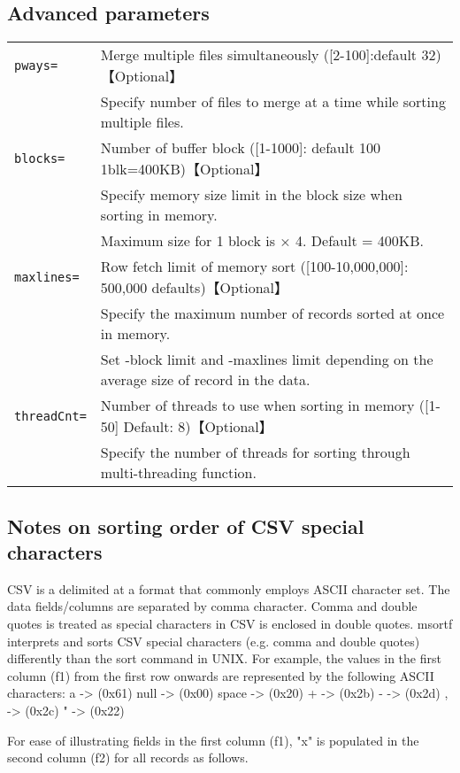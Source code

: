 \documentclass[a4paper]{jarticle}
\begin{document}
\subsection*{Advanced parameters}
\begin{table}[htbp]
{\small
\begin{tabular}{ll}
\verb|pways=|    & Merge multiple files simultaneously ([2-100]:default 32)【Optional】\\
& Specify  number of files to merge at a time while sorting multiple files. \\
\verb|blocks=|   & Number of buffer block ([1-1000]: default 100 1blk=400KB)【Optional】\\
& Specify memory size limit in the block size when sorting in memory.\\
& Maximum size for 1 block is × 4. Default = 400KB. \\
\verb|maxlines=| & Row fetch limit of memory sort ([100-10,000,000]: 500,000 defaults)【Optional】\\
& Specify the maximum number of records sorted at once in memory.\\
& Set -block limit and -maxlines limit depending on the average size of record in the data.\\
\verb|threadCnt=| & Number of threads to use when sorting in memory ([1-50] Default: 8)【Optional】\\
& Specify the number of threads for sorting through multi-threading function. \\
\end{tabular} 
}
\end{table} 

\subsection*{Notes on sorting order of CSV special characters}
CSV is a delimited at a format that commonly employs ASCII character set. The data fields/columns are separated by comma character. Comma and double quotes is treated as special characters in CSV is enclosed in double quotes. msortf interprets and sorts CSV special characters (e.g. comma and double quotes) differently than the sort command in UNIX. 
For example, the values in the first column (f1) from the first row onwards are represented by the following ASCII characters: 
a -> (0x61)
null -> (0x00)
space -> (0x20)
+ -> (0x2b)
- -> (0x2d)
, -> (0x2c) 
" -> (0x22)

For ease of illustrating fields in the first column (f1), "x" is populated in the second column (f2) for all records as follows. \\
\end{document}
